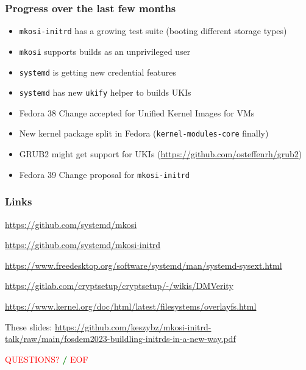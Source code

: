 \documentclass[]{beamer}
\newcommand\pp\pause
\begin{document}
\begin{frame}
  \frametitle{Progress over the last few months}
  
  \begin{itemize}
  \item \texttt{mkosi-initrd} has a growing test suite (booting different storage types)
  \item \texttt{mkosi} supports builds as an unprivileged user
  \item \texttt{systemd} is getting new credential features
  \item \texttt{systemd} has new \texttt{ukify} helper to builds UKIs
  \item Fedora 38 Change accepted for Unified Kernel Images for VMs
  \item New kernel package split in Fedora (\texttt{kernel-modules-core} finally)
  \item GRUB2 might get support for UKIs (\url{https://github.com/osteffenrh/grub2})
  \item Fedora 39 Change proposal for \texttt{mkosi-initrd}
  \end{itemize}
\end{frame}
  





\begin{frame}[fragile]
  \frametitle{Links}

  \url{https://github.com/systemd/mkosi}

  \url{https://github.com/systemd/mkosi-initrd}

  \url{https://www.freedesktop.org/software/systemd/man/systemd-sysext.html}

  {
    \small
    \url{https://gitlab.com/cryptsetup/cryptsetup/-/wikis/DMVerity}\\
    }

  \url{https://www.kernel.org/doc/html/latest/filesystems/overlayfs.html}

  \quad

  These slides:
  \url{https://github.com/keszybz/mkosi-initrd-talk/raw/main/fosdem2023-buildling-initrds-in-a-new-way.pdf}

  \quad
  \pp

  \hfill \textcolor{red}{QUESTIONS?} \textcolor{green}{\bf /} \textcolor{red}{EOF} \hfill{}

\end{frame}
\end{document}

